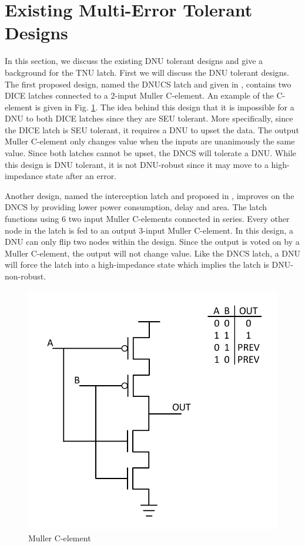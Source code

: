 \section{Existing Multi-Error Tolerant Designs} \label{sec:DNUdes}

In this section, we discuss the existing DNU tolerant designs and give a background for the TNU latch. First we will discuss the DNU tolerant designs. The first proposed design, named the DNUCS latch and given in \cite{DNCS}, contains two DICE latches connected to a 2-input Muller C-element. An example of the C-element is given in Fig. \ref{Cele_fig}. The idea behind this design that it is impossible for a DNU to both DICE latches since they are SEU tolerant. More specifically, since the DICE latch is SEU tolerant, it requires a DNU to upset the data. The output Muller C-element only changes value when the inputs are unanimously the same value. Since both latches cannot be upset, the DNCS will tolerate a DNU. While this design is DNU tolerant, it is not DNU-robust since it may move to a high-impedance state after an error. 

Another design, named the interception latch and proposed in \cite{Inter}, improves on the DNCS by providing lower power consumption, delay and area. The latch functions using 6 two input Muller C-elements connected in series. Every other node in the latch is fed to an output 3-input Muller C-element. In this design, a DNU can only flip two nodes within the design. Since the output is voted on by a Muller C-element, the output will not change value. Like the DNCS latch, a DNU will force the latch into a high-impedance state which implies the latch is DNU-non-robust.

\begin{figure}[!htbp]
	\centering
	\includegraphics[width=0.75\linewidth]{Figures/C_ele}
	\caption{Muller C-element}
	\label{Cele_fig}
\end{figure}

